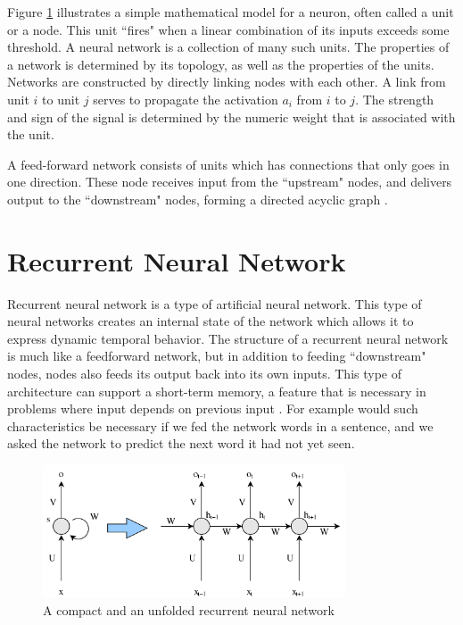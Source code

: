 Figure \ref{fig:nn-rnn} illustrates a simple mathematical model for a neuron, often called a unit or a node. This unit ``fires" when a linear combination of its inputs exceeds some threshold. A neural network is a collection of many such units. The properties of a network is determined by its topology, as well as the properties of the units. Networks are constructed by directly linking nodes with each other. A link from unit \(i\) to unit \(j\) serves to propagate the activation \(a_{i}\) from \(i\) to \(j\). The strength and sign of the signal is determined by the numeric weight that is associated with the unit. 

A feed-forward network consists of units which has connections that only goes in one direction. These node receives input from the ``upstream" nodes, and delivers output to the ``downstream" nodes, forming a directed acyclic graph \citep{russell2010aimodernapproach}.


\section{Recurrent Neural Network}
\label{sec:reccurent_neural_network}
Recurrent neural network is a type of artificial neural network. This type of neural networks creates an internal state of the network which allows it to express dynamic temporal behavior. The structure of a recurrent neural network  \citep{rumelhart1988learning} is much like a feedforward network, but in addition to feeding ``downstream" nodes, nodes also feeds its output back into its own inputs. This type of architecture can support a short-term memory, a feature that is necessary in problems where input depends on previous input \citep{russell2010aimodernapproach}. For example would such characteristics be necessary if we fed the network words in a sentence, and we asked the network to predict the next word it had not yet seen.

\begin{figure}[ht]
    \centering
    \includegraphics[width=0.8\textwidth]{fig/related_work/nn_recurrent.png}
    \caption{A compact and an unfolded recurrent neural network}
    \label{fig:nn-rnn}
\end{figure}


